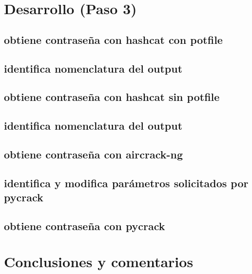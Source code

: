 \documentclass[letter,12pt]{article}
\begin{document}
\section{Desarrollo (Paso 3)}

\subsection{obtiene contraseña con hashcat con potfile}

\subsection{identifica nomenclatura del output}

\subsection{obtiene contraseña con hashcat sin potfile}

\subsection{identifica nomenclatura del output}

\subsection{obtiene contraseña con aircrack-ng}

\subsection{identifica y modifica parámetros solicitados por pycrack}

\subsection{obtiene contraseña con pycrack}


\section*{Conclusiones y comentarios}
\end{document}
